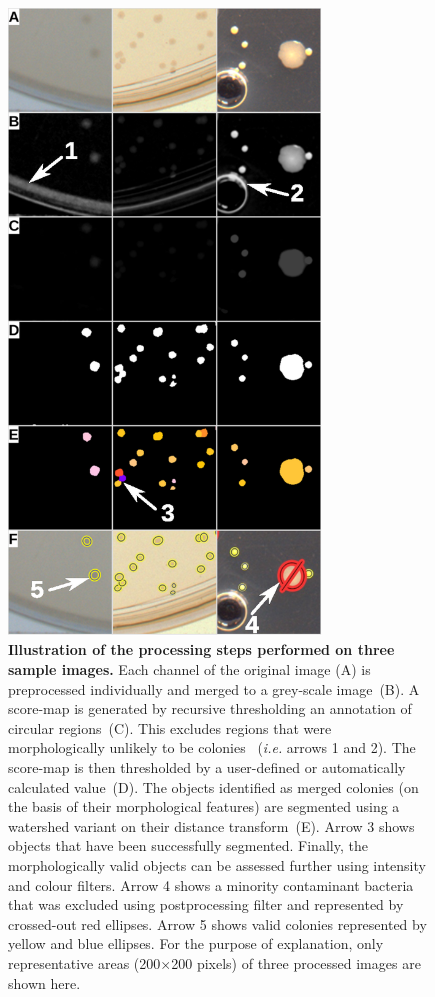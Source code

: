 \documentclass[10pt]{article}
\begin{document}
\begin{figure}[!ht]
\begin{center}
 \includegraphics[width=3.27in]{./fig2.eps}
\end{center}
\caption{{\bf Illustration of the processing steps performed on three sample images.}
Each channel of the original image (A) is preprocessed individually and merged
to a grey-scale image~(B).
A score-map is generated by recursive thresholding an annotation of circular regions~(C). 
This excludes regions that were morphologically unlikely to be colonies~
(\emph{i.e.} arrows 1 and 2).
The score-map is then thresholded by a user-defined or automatically calculated
value~(D).
The objects identified as merged colonies (on the basis of their morphological
features) are segmented using a watershed variant on their distance transform~(E).
Arrow 3 shows objects that have been successfully segmented. Finally, the morphologically valid objects can be assessed further using intensity and colour filters.
Arrow 4 shows a minority contaminant bacteria that was excluded using postprocessing filter and represented by crossed-out red ellipses. 
Arrow 5 shows valid colonies represented by yellow and blue ellipses.
For the purpose of explanation, only representative areas (200$\times{}$200 pixels)
of three processed images are shown here.}
\label{figPipeline}
\end{figure}
\end{document}
